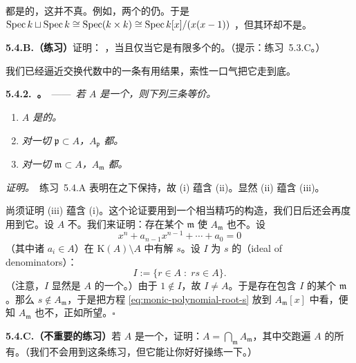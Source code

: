 \trNormal{}\trScheme{}都是\trIntegral{}的，这并不真。例如，两个\trNormal{}\trScheme{}的\trDisjointUnion{}仍\trNormal。于是 $\operatorname{Spec} k\sqcup\operatorname{Spec} k\cong\operatorname{Spec}(k\times k)\cong\operatorname{Spec} k[x]/(x(x-1))$ \trNormal，但其\trGlobalSections{}环却不是\trIntegralDomain。

\textbf{5.4.B.（练习）}\quad 证明：\trNoetherian{}\trScheme{} \trNormal，当且仅当它是有限多个\trIntegral{}\trNoetherian{}\trNormal{}\trScheme{}的\trDisjointUnion。（提示：练习~5.3.C。）

我们已经逼近交换代数中的一条有用结果，索性一口气把它走到底。

\textbf{5.4.2.\ \trhProposition{}。}\ ——\ \emph{若 $A$ 是一个\trIntegralDomain，则下列三条等价。}
\begin{enumerate}[label=(\roman*)]
  \item \emph{$A$ 是\trIntegrallyClosed{}的。}
  \item \emph{对一切\trPrimeIdeal{} $\mathfrak{p}\subset A$，$A_{\mathfrak{p}}$ 都\trIntegrallyClosed{}。}
  \item \emph{对一切\trMaximalIdeal{} $\mathfrak{m}\subset A$，$A_{\mathfrak{m}}$ 都\trIntegrallyClosed{}。}
\end{enumerate}

\emph{证明。}\ 练习~5.4.A 表明\trIntegralClosedness{}在\trLocalization{}之下保持，故 (i) 蕴含 (ii)。显然 (ii) 蕴含 (iii)。

尚须证明 (iii) 蕴含 (i)。这个论证要用到一个相当精巧的构造，我们日后还会再度用到它。设 $A$ 不\trIntegrallyClosed{}。我们来证明：存在某个 $\mathfrak{m}$ 使 $A_{\mathfrak{m}}$ 也不\trIntegrallyClosed{}。设
\begin{equation*}\tag{5.4.2.1}\label{eq:monic-polynomial-root-s}
x^n+a_{n-1}x^{n-1}+\cdots+a_0=0
\end{equation*}
（其中诸 $a_i\in A$）在 $\mathrm{K}(A)\setminus A$ 中有解 $s$。设 $I$ 为 $s$ 的\textbf{\trIdealOfDenominators{}}（ideal of denominators）：
\begin{equation*}\tag{5.4.2.2}\label{eq:ideal-of-denominators}
I:=\{r\in A\;:\;rs\in A\}.
\end{equation*}
（注意，$I$ 显然是 $A$ 的一个\trIdeal。）由于 $1\notin I$，故 $I\neq A$。于是存在包含 $I$ 的某个\trMaximalIdeal{} $\mathfrak{m}$。那么 $s\notin A_{\mathfrak{m}}$，于是把方程 \eqref{eq:monic-polynomial-root-s} 放到 $A_{\mathfrak{m}}[x]$ 中看，便知 $A_{\mathfrak{m}}$ 也不\trIntegrallyClosed{}，正如所望。\hfill$\square$

\textbf{5.4.C.（不重要的练习）}\quad 若 $A$ 是一个\trIntegralDomain，证明：$A=\bigcap_{\mathfrak{m}}A_{\mathfrak{m}}$，其中交跑遍 $A$ 的所有\trMaximalIdeal。（我们不会用到这条练习，但它能让你好好操练一下\trIdealOfDenominators{}。）

